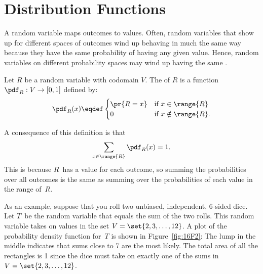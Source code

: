 \section{Distribution Functions}\label{distributions_sec}

A random variable maps outcomes to values. Often, random variables
that show up for different spaces of outcomes wind up behaving in much
the same way because they have the same probability of having any
given value.  Hence, random variables on different probability spaces
may wind up having the same .

\begin{definition}
Let $R$ be a random variable with codomain $V$.
The  of $R$
is a function $\pdf_R : V \to [0,1]$ defined by:
%
\[
\pdf_R(x) \eqdef \begin{cases}
            \pr{R = x} & \text{if } x \in \range{R}\\
             0 & \text{if } x \notin \range{R}.
           \end{cases}
\]
\end{definition}
%
A consequence of this definition is that
%
\[
\sum_{x \in \range{R}} \pdf_R(x) = 1.
\]
This is because $R$~has a value for each outcome, so summing the
probabilities over all outcomes is the same as summing over the
probabilities of each value in the range of~$R$.

As an example, suppose that you roll two unbiased, independent,
6-sided dice.  Let $T$~be the random variable that equals the sum of
the two rolls.  This random variable takes on values in the set $V =
\set{2, 3, \dots, 12}$.  A plot of the probability density function
for~$T$ is shown in Figure~\ref{fig:16F2}: The lump in the middle
indicates that sums close to 7 are the most likely.  The total area of
all the rectangles is 1 since the dice must take on exactly one of the
sums in $V = \set{2, 3, \dots, 12}$.

